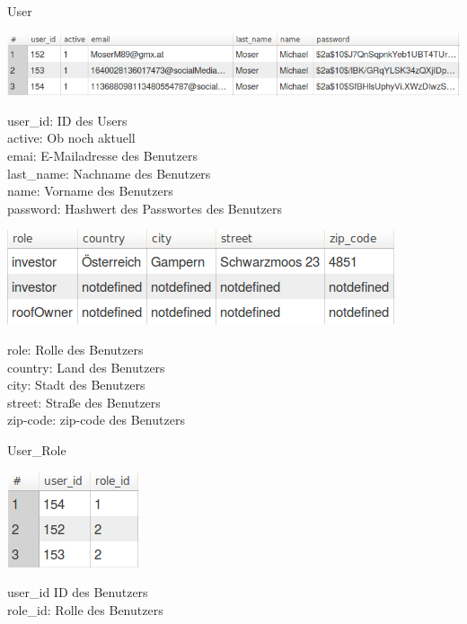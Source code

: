 \documentclass[12pt,a4paper]{article}
\begin{document}
\textbullet User

\includegraphics[scale=0.5]{./Graphics/user1}

\noindent \textbullet user\_id: ID des Users\\
\textbullet active: Ob noch aktuell \\
\textbullet emai: E-Mailadresse des Benutzers\\
\textbullet last\_name: Nachname des Benutzers\\
\textbullet name: Vorname des Benutzers\\
\textbullet password: Hashwert des Passwortes des Benutzers \\
\bigskip

\includegraphics[scale=0.5]{./Graphics/user2}

\noindent \textbullet role: Rolle des Benutzers\\
\textbullet country: Land des Benutzers\\
\textbullet city: Stadt des Benutzers\\
\textbullet street: Straße des Benutzers\\
\textbullet zip-code: zip-code des Benutzers\\
\bigskip

\textbullet User\_Role

\includegraphics[scale=0.5]{./Graphics/user_role}

\noindent \textbullet user\_id ID des Benutzers\\
\textbullet role\_id: Rolle des Benutzers\\
\bigskip
\end{document}
